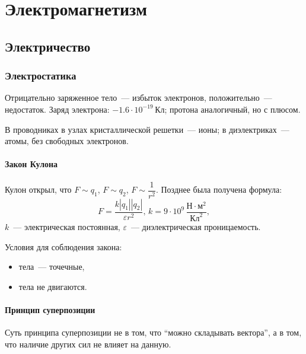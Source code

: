 \documentclass[12pt]{article}
\begin{document}
	\section{Электромагнетизм}
	
	\subsection{Электричество}
	
	\subsubsection{Электростатика}
	
	\begin{definition}[Заряд, $q$ Кл]
		Отрицательно заряженное тело~--- избыток электронов, положительно~--- недостаток. Заряд электрона: $-1.6 \cdot 10^{-19} \, \text{Кл}$; протона аналогичный, но с плюсом.
	\end{definition}
	
	\begin{definition}
		В проводниках в узлах кристаллической решетки~--- ионы; в диэлектриках~--- атомы, без свободных электронов.
	\end{definition}
	
	\paragraph{Закон Кулона}
	
	Кулон открыл, что $F \sim q_1$, $F \sim q_2$, $F \sim \dfrac{1}{r^2}$. Позднее была получена формула:
	$$
	F = \dfrac{k |q_1| |q_2|}{\varepsilon r^2}, \, k = 9 \cdot 10^9 \, \dfrac{\text{Н} \cdot \text{м}^2}{\text{Кл}^2},
	$$
	$k$~--- электрическая постоянная, $\varepsilon$~--- диэлектрическая проницаемость.
	
	Условия для соблюдения закона:
	\begin{itemize}
		\item тела~--- точечные,
		\item тела не двигаются.
	\end{itemize}
	
	\paragraph{Принцип суперпозиции}
	
	Суть принципа суперпозиции не в том, что ``можно складывать вектора'', а в том, что наличие других сил не влияет на данную.
	
\end{document}

